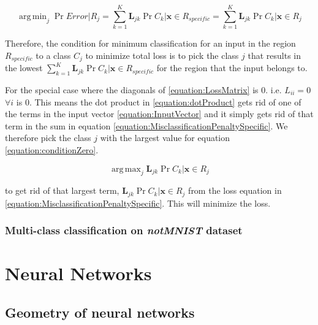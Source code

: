 \documentclass[a4paper,12pt]{article}
\DeclareMathOperator*{\argmin}{arg\,min}
\DeclareMathOperator*{\argmax}{arg\,max}
\begin{document}
\begin{equation}
\label{equation:minimumSum}
 \argmin_j \Pr{Error | R_{j}} = \sum_{k=1}^{K} \mathbf{L}_{jk} \Pr{C_{k} | \mathbf{x} \in R_{specific}} = \sum_{k=1}^{K} \mathbf{L}_{jk} \Pr{C_{k} | \mathbf{x} \in R_{j}}
\end{equation}

Therefore, the condition for minimum classification for an input in the region $R_{specific}$ to a class $C_{j}$ to minimize total loss is to pick the class $j$ that results in the lowest $\sum_{k=1}^{K} \mathbf{L}_{jk} \Pr{C_{k} | \mathbf{x} \in R_{specific}}$ for the region that the input belongs to. 

For the special case where the diagonals of \ref{equation:LossMatrix} is 0. i.e. $L_{ii} = 0$ $\forall i$  is 0. This means the dot product in \ref{equation:dotProduct} gets rid of one of the terms in the input vector \ref{equation:InputVector} and it simply gets rid of that term in the sum in equation \ref{equation:MisclassificationPenaltySpecific}. We therefore pick the class $j$ with the largest value for equation \ref{equation:conditionZero}. 

\begin{equation}
\label{equation:conditionZero}
\argmax_j \mathbf{L}_{jk} \Pr{C_{k} | \mathbf{x} \in R_{j}} 
\end{equation}

to get rid of that largest term, $\mathbf{L}_{jk} \Pr{C_{k} | \mathbf{x} \in R_{j}}$ from 
the loss equation in \ref{equation:MisclassificationPenaltySpecific}. This will minimize the loss. 

\clearpage
\subsubsection{Multi-class classification on \textit{notMNIST} dataset}

\clearpage
\section{Neural Networks}
\subsection{Geometry of neural networks}
\end{document}
